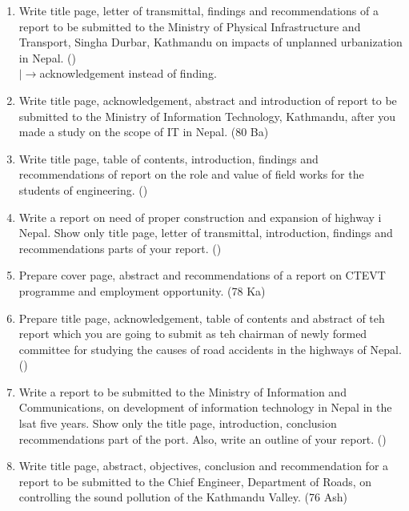 \documentclass[12pt]{article}
\newcommand{\lb}{\\$\left|\rightarrow\right.$}
\begin{document}
\begin{enumerate}
    \item Write title page, letter of transmittal, findings and recommendations of a report to be submitted to the Ministry of Physical Infrastructure and Transport, Singha Durbar, Kathmandu on impacts of unplanned urbanization in Nepal. \hfill ()
      \lb acknowledgement instead of finding. \hfill {}

    \item Write title page, acknowledgement, abstract and introduction of report to be submitted to the Ministry of Information Technology, Kathmandu, after you made a study on the scope of IT in Nepal. \hfill (80 Ba)

    \item Write title page, table of contents, introduction, findings and recommendations of report on the role and value of field works for the students of engineering. \hfill ()

    \item Write a report on need of proper construction and expansion of highway i Nepal. Show only title page, letter of transmittal, introduction, findings and recommendations parts of your report. \hfill ()

    \item Prepare cover page, abstract and recommendations of a report on CTEVT programme and employment opportunity. \hfill (78 Ka)

    \item Prepare title page, acknowledgement, table of contents and abstract of teh report which you are going to submit as teh chairman of newly formed committee for studying the causes of road accidents in the highways of Nepal. \hfill ()

    \item Write a report to be submitted to the Ministry of Information and Communications, on development of information technology in Nepal in the lsat five years. Show only the title page, introduction, conclusion recommendations part of the port. Also, write an outline of your report. \hfill ()

    \item Write title page, abstract, objectives, conclusion and recommendation for a report to be submitted to the Chief Engineer, Department of Roads, on controlling the sound pollution of the Kathmandu Valley. \hfill (76 Ash)
  \end{enumerate}
  
\end{document}
